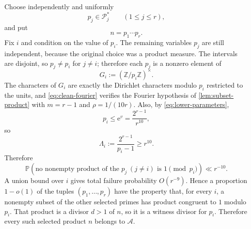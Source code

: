\documentclass[11pt]{amsart}
\theoremstyle{definition}
\theoremstyle{remark}
\numberwithin{equation}{section}
\newcommand{\e}{\mathrm e}
\newcommand{\Acal}{\mathcal A}
\newcommand{\Pcal}{\mathcal P}
\begin{document}
Choose independently and uniformly
\[
 p_j\in\Pcal_j^*\qquad(1\le j\le r),
\]
and put
\[
 n=p_1\cdots p_r.
\]
Fix $i$ and condition on the value of $p_i$.  The remaining variables
$p_j$ are still independent, because the original choice was a product
measure.  The intervals are disjoint, so $p_j\ne p_i$ for $j\ne i$;
therefore each $p_j$ is a nonzero element of
\[
 G_i:=(\mathbb Z/p_i\mathbb Z)^\times.
\]
The characters of $G_i$ are exactly the Dirichlet characters modulo
$p_i$ restricted to the units, and \eqref{eq:clean-fourier} verifies the
Fourier hypothesis of \cref{lem:subset-product} with $m=r-1$ and
$\rho=1/(10r)$.  Also, by \eqref{eq:lower-parameters},
\[
 p_i\le\e^v=\frac{2^{r-1}}{r^{10}},
\]
so
\[
 \Lambda_i:=\frac{2^{r-1}}{p_i-1}\ge r^{10}.
\]
Therefore
\[
 \mathbb P\left(
 \text{no nonempty product of the }p_j\ (j\ne i)
 \text{ is }1\pmod{p_i}
 \right)\ll r^{-10}.
\]
A union bound over $i$ gives total failure probability $O(r^{-9})$.  Hence
a proportion $1-o(1)$ of the tuples $(p_1,\ldots,p_r)$ have the property
that, for every $i$, a nonempty subset of the other selected primes has
product congruent to $1$ modulo $p_i$.  That product is a divisor $d>1$
of $n$, so it is a witness divisor for $p_i$.  Therefore every such
selected product $n$ belongs to $\Acal$.
\end{document}
